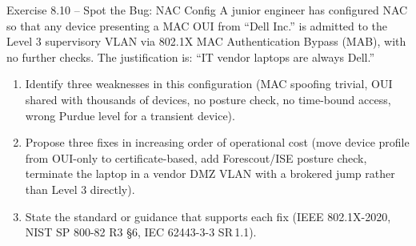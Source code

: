 \documentclass[11pt,a4paper]{article}
\begin{document}
\begin{taskbox}{Exercise 8.10 -- Spot the Bug: NAC Config}
A junior engineer has configured NAC so that any device presenting a MAC OUI from ``Dell Inc.'' is admitted to the Level 3 supervisory VLAN via 802.1X MAC Authentication Bypass (MAB), with no further checks. The justification is: ``IT vendor laptops are always Dell.''
\begin{enumerate}\setlength{\itemsep}{1pt}
  \item Identify three weaknesses in this configuration (MAC spoofing trivial, OUI shared with thousands of devices, no posture check, no time-bound access, wrong Purdue level for a transient device).
  \item Propose three fixes in increasing order of operational cost (move device profile from OUI-only to certificate-based, add Forescout/ISE posture check, terminate the laptop in a vendor DMZ VLAN with a brokered jump rather than Level 3 directly).
  \item State the standard or guidance that supports each fix (IEEE 802.1X-2020, NIST SP 800-82 R3 \S 6, IEC 62443-3-3 SR\,1.1).
\end{enumerate}
\end{taskbox}
\end{document}
